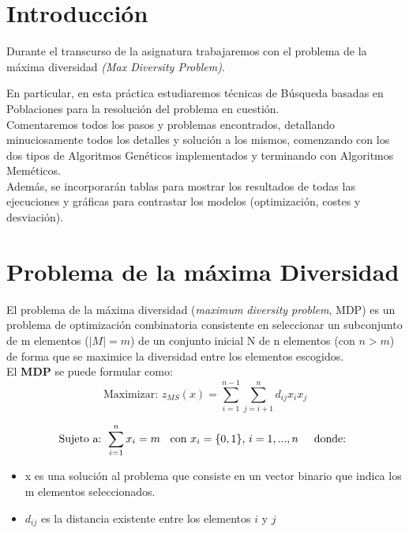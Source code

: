 

\newpage


\section{Introducción}
\hspace{1.5cm} Durante el transcurso de la asignatura trabajaremos con el problema de la máxima diversidad \textit{(Max Diversity Problem)}. 


En particular, en esta práctica estudiaremos técnicas de Búsqueda basadas en Poblaciones para la resolución del problema en cuestión. \\
Comentaremos todos los pasos y problemas encontrados, detallando minuciosamente todos los detalles y solución a los mismos, comenzando con los dos tipos de Algoritmos Genéticos implementados y terminando con Algoritmos Meméticos. \\

Además, se incorporarán tablas para mostrar los resultados de todas las ejecuciones y  gráficas para contrastar los modelos (optimización, costes y desviación).


\section{Problema de la máxima Diversidad}
\hspace{1.5cm} El problema de la máxima diversidad (\textit{maximum diversity problem}, MDP) es un problema de optimización combinatoria consistente en seleccionar un subconjunto de m elementos ($|M|=m$) de un conjunto inicial N de n elementos (con $n>m$) de forma que se maximice la diversidad entre los elementos escogidos. \\


El \textbf{MDP} se puede formular como: \\


\[
\text{Maximizar:   }  z_{MS}(x) = \sum_{i=1}^{n-1} \sum_{j=i+1}^{n} d_{ij}x_i x_j
\]



\[
\text{Sujeto a: } \sum_{i=1}^{n} x_i=m \hspace{0.2cm} \text{ con } x_i=\{0,1\} \text{, } i=1,...,n  \hspace{0.5cm} \text{donde: }
\]


\begin{itemize}
	\item x es una solución al problema que consiste en un vector binario que indica los m elementos seleccionados.
	\item $d_{ij}$ es la distancia existente entre los elementos $i$ y $j$
	
\end{itemize}


